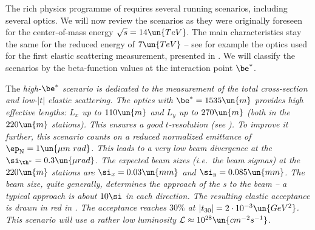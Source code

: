

The rich physics programme of  requires several running scenarios, including several optics. We will now review the scenarios as they were originally foreseen for the center-of-mass energy $\sqrt s = 14\un{TeV}$. The main characteristics stay the same for the reduced energy of $7\un{TeV}$ -- see for example the optics used for the first elastic scattering measurement, presented in . We will classify the scenarios by the beta-function values at the interaction point $\be^*$.

\> The \em{high-$\be^*$} scenario is dedicated to the measurement of the total cross-section and low-$|t|$ elastic scattering. The optics with $\be^* = 1535\un{m}$ provides high effective lengths: $L_x$ up to $110\un{m}$ and $L_y$ up to $270\un{m}$ (both in the $220\un{m}$ stations). This ensures a good $t$-resolution (see ). To improve it further, this scenario counts on a reduced normalized emittance of $\ep_{\rm N}=1\un{\mu m\ rad}$. This leads to a very low beam divergence at the  $\si_{\th^*} = 0.3\un{\mu rad}$. The expected beam sizes (i.e.~the beam sigmas) at the $220\un{m}$ stations are $\si_x = 0.03\un{mm}$ and $\si_y = 0.085\un{mm}$. The beam size, quite generally, determines the approach of the s to the beam -- a typical approach is about $10\si$ in each direction. The resulting elastic acceptance is drawn in red in . The acceptance reaches $30\percent$ at $|t_{30}| = 2\cdot10^{-3}\un{GeV^2}$. This scenario will use a rather low luminosity ${\cal L} \approx 10^{28} \un{cm^{-2}s^{-1}}$.

